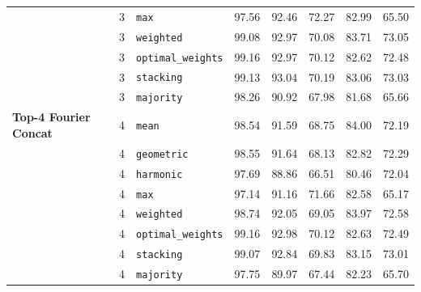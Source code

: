 \begin{table}[t]
\begin{tabular}{l c l c c c c}
 & 3 & \texttt{max} & 97.56 & 92.46 & 72.27 & 82.99 & 65.50 \\
 & 3 & \texttt{weighted} & 99.08 & 92.97 & 70.08 & 83.71 & 73.05 \\
 & 3 & \texttt{optimal_weights} & 99.16 & 92.97 & 70.12 & 82.62 & 72.48 \\
 & 3 & \texttt{stacking} & 99.13 & 93.04 & 70.19 & 83.06 & 73.03 \\
 & 3 & \texttt{majority} & 98.26 & 90.92 & 67.98 & 81.68 & 65.66 \\
\midrule
\textbf{Top-4 Fourier Concat} & 4 & \texttt{mean} & 98.54 & 91.59 & 68.75 & 84.00 & 72.19 \\
 & 4 & \texttt{geometric} & 98.55 & 91.64 & 68.13 & 82.82 & 72.29 \\
 & 4 & \texttt{harmonic} & 97.69 & 88.86 & 66.51 & 80.46 & 72.04 \\
 & 4 & \texttt{max} & 97.14 & 91.16 & 71.66 & 82.58 & 65.17 \\
 & 4 & \texttt{weighted} & 98.74 & 92.05 & 69.05 & 83.97 & 72.58 \\
 & 4 & \texttt{optimal_weights} & 99.16 & 92.98 & 70.12 & 82.63 & 72.49 \\
 & 4 & \texttt{stacking} & 99.07 & 92.84 & 69.83 & 83.15 & 73.01 \\
 & 4 & \texttt{majority} & 97.75 & 89.97 & 67.44 & 82.23 & 65.70 \\
\bottomrule
\end{tabular}
\end{table}